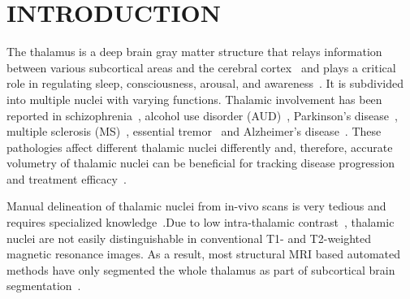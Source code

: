 \section{INTRODUCTION}

The thalamus is a deep brain gray matter structure that relays information between various subcortical areas and the cerebral cortex~\cite{aggleton_Hippocampalanterior_2010} and plays a critical role in regulating sleep, consciousness, arousal, and awareness~\cite{steriade_Functional_1988,bodart_Coma_2013,stein_Functional_2000}. It is subdivided into multiple nuclei with varying functions. Thalamic involvement has been reported in schizophrenia~\cite{chen_Hippocampus_2017, parnaudeau_Mediodorsal_2018}, alcohol use disorder (AUD)~\cite{arts_Korsakoff_2017, fama_Thalamic_2014}, Parkinson's disease~\cite{1921968:27964343}, multiple sclerosis (MS)~\cite{minagar_Thalamus_2013}, essential tremor~\cite{fama_Thalamic_2015,benabid_Chronic_1996,brodkey_Tremor_2004} and Alzheimer's disease~\cite{braak_Alzheimer_1991}. These pathologies affect different thalamic nuclei differently and, therefore, accurate volumetry of thalamic nuclei can be beneficial for tracking disease progression and treatment efficacy~\cite{lee_Lateral_2016,braak_Alzheimer_1991}.

Manual delineation of thalamic nuclei from in-vivo scans is very tedious and requires specialized knowledge~\cite{jakab_Generation_2012,krauth_Mean_2010}.Due to low intra-thalamic contrast~\cite{tourdias_Visualization_2014}, thalamic nuclei are not easily distinguishable in conventional T1- and T2-weighted magnetic resonance images. As a result, most structural MRI based automated methods have only segmented the whole thalamus as part of subcortical brain segmentation~\cite{1921968:27964336,1921968:27964350,1921968:27964349,1921968:27964347,1921968:27964310}.


